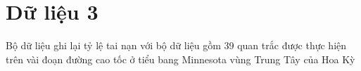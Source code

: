 \section{Dữ liệu 3}

Bộ dữ liệu ghi lại tỷ lệ tai nạn với bộ dữ liệu gồm 39
quan trắc được thực hiện trên vài đoạn đường cao tốc ở tiểu bang Minnesota
vùng Trung Tây của Hoa Kỳ